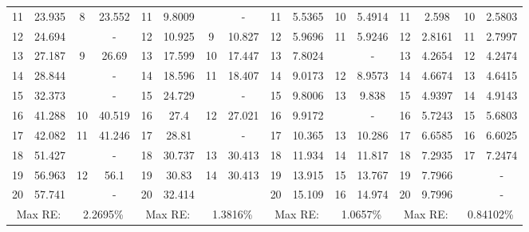 \documentclass[../../main.tex]{subfiles}
\begin{document}
\begin{table}[htbp]
{{\begin{tabular}{|cccc||cccc||cccc||cccc|}
			11    & 23.935 & 8     & {23.552} & 11    & 9.8009 &       & {-} & 11    & 5.5365 & 10    & 5.4914 & 11    & 2.598 & 10    & {2.5803} \\
			12    & 24.694 &       & -     & 12    & 10.925 & 9     & 10.827 & 12    & 5.9696 & 11    & 5.9246 & 12    & 2.8161 & 11    & {2.7997} \\
			13    & 27.187 & 9     & {26.69} & 13    & 17.599 & 10    & 17.447 & 13    & 7.8024 &       & {-} & 13    & 4.2654 & 12    & {4.2474} \\
			14    & 28.844 &       & -     & 14    & 18.596 & 11    & 18.407 & 14    & 9.0173 & 12    & 8.9573 & 14    & 4.6674 & 13    & {4.6415} \\
			15    & 32.373 &       & -     & 15    & 24.729 &       & {-} & 15    & 9.8006 & 13    & 9.838 & 15    & 4.9397 & 14    & {4.9143} \\
			16    & 41.288 & 10    & {40.519} & 16    & 27.4  & 12    & 27.021 & 16    & 9.9172 &       & {-} & 16    & 5.7243 & 15    & {5.6803} \\
			17    & 42.082 & 11    & {41.246} & 17    & 28.81 &       & {-} & 17    & 10.365 & 13    & 10.286 & 17    & 6.6585 & 16    & {6.6025} \\
			18    & 51.427 &       & -     & 18    & 30.737 & 13    & 30.413 & 18    & 11.934 & 14    & 11.817 & 18    & 7.2935 & 17    & {7.2474} \\
			19    & 56.963 & 12    & {56.1} & 19    & 30.83 & 14    & 30.413 & 19    & 13.915 & 15    & 13.767 & 19    & 7.7966 &       & - \\
			20    & 57.741 &       & -     & 20    & 32.414 &       &       & 20    & 15.109 & 16    & 14.974 & 20    & 9.7996 &       & - \\
			\hline
			\multicolumn{2}{|c}{Max RE:} & \multicolumn{2}{c||}{2.2695\%} & \multicolumn{2}{c}{Max RE:} & \multicolumn{2}{c||}{1.3816\%} & \multicolumn{2}{c}{Max RE:} & \multicolumn{2}{c||}{1.0657\%} & \multicolumn{2}{c}{Max RE:} & \multicolumn{2}{c|}{0.84102\%} \\
			\hline
		\end{tabular}%
		\label{tab:Table_plate_2}%
	}}
\end{table}%
\FloatBarrier
\end{document}
